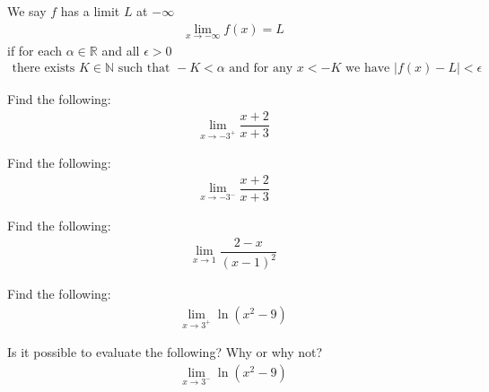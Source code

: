 \begin{definition}
We say $f$ has a limit $L$ at $-\infty$ 
\begin{align*}
    \lim_{x \longrightarrow -\infty} f(x) = L
\end{align*}
if for each $\alpha \in \mathbb{R}$ and all $\epsilon > 0$ 
\begin{align*}
    \text{there exists} \hspace{4pt} K \in \mathbb{N} \hspace{4pt} \text{such that} \hspace{4pt} -K < \alpha \hspace{4pt} \text{and for any} \hspace{4pt} x < -K \hspace{4pt} \text{we have} \hspace{4pt} \lvert f(x) - L \rvert < \epsilon
\end{align*}
\end{definition}

\begin{exercise}
Find the following:
\begin{align*}
    \lim_{x \longrightarrow -3^{+}} \dfrac{x+2}{x+3}
\end{align*}
\end{exercise}

\begin{exercise}
Find the following:
\begin{align*}
    \lim_{x \longrightarrow -3^{-}} \dfrac{x+2}{x+3}
\end{align*}
\end{exercise}

\begin{exercise}
Find the following:
\begin{align*}
    \lim_{x \longrightarrow 1} \dfrac{2-x}{(x-1)^{2}}
\end{align*}
\end{exercise}

\begin{exercise}
Find the following:
\begin{align*}
    \lim_{x \longrightarrow 3^{+}} \ln(x^{2} - 9)
\end{align*}
\end{exercise}

\begin{exercise}
Is it possible to evaluate the following? Why or why not?
\begin{align*}
    \lim_{x \longrightarrow 3^{-}} \ln(x^{2} - 9)
\end{align*}
\end{exercise}

